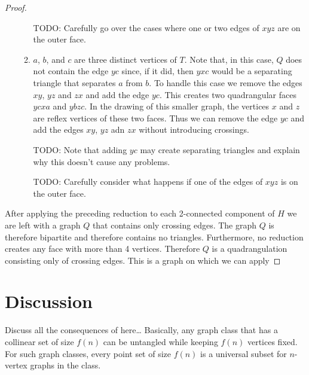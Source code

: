 \documentclass{patmorin}
\begin{document}
\begin{proof}
\begin{enumerate}
\begin{enumerate}
            TODO: Carefully go over the cases where one or two edges of $xyz$ are on the outer face.

          \item $a$, $b$, and $c$ are three distinct vertices of $T$.
            Note that, in this case, $Q$ does not contain the edge $yc$
            since, if it did, then $yxc$ would be a separating triangle
            that separates $a$ from $b$.  To handle this case we remove
            the edges $xy$, $yz$ and $zx$ and add the edge $yc$.
            This creates two quadrangular faces $ycxa$ and $ybzc$.
            In the drawing of this smaller graph, the vertices $x$ and
            $z$ are reflex vertices of these two faces.  Thus we can
            remove the edge $yc$ and add the edges $xy$, $yz$ adn $zx$
            without introducing crossings.

            TODO: Note that adding $yc$ may create separating triangles and explain why this doesn't cause any problems.

            TODO: Carefully consider what happens if one of the edges of $xyz$ is on the outer face.
      \end{enumerate}
   \end{enumerate}
   After applying the preceding reduction to each 2-connected component
   of $H$ we are left with a graph $Q$ that contains only crossing
   edges.  The graph $Q$ is therefore bipartite and therefore contains
   no triangles.  Furthermore, no reduction creates any face with more
   than 4 vertices. Therefore $Q$ is a quadrangulation consisting only
   of crossing edges.  This is a graph on which we can apply 

\end{proof}



\section{Discussion}

Discuss all the consequences of  here\ldots
Basically, any graph class that has a collinear set of size $f(n)$ can 
be untangled while keeping $f(n)$ vertices fixed.  For such graph classes,
every point set of size $f(n)$ is a universal subset for $n$-vertex graphs
in the class.
\end{document}
